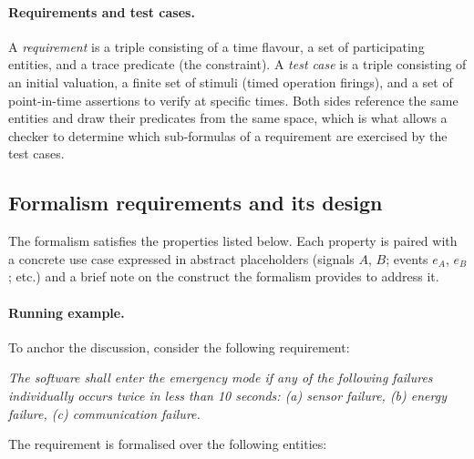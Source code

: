 \paragraph{Requirements and test cases.} A \emph{requirement} is a triple consisting of a time flavour, a set of participating entities, and a trace predicate (the constraint). A \emph{test case} is a triple consisting of an initial valuation, a finite set of stimuli (timed operation firings), and a set of point-in-time assertions to verify at specific times. Both sides reference the same entities and draw their predicates from the same space, which is what allows a checker to determine which sub-formulas of a requirement are exercised by the test cases.

\subsection{Formalism requirements and its design}

The formalism satisfies the properties listed below. Each property is paired with a concrete use case expressed in abstract placeholders (signals $A$, $B$; events $e_A$, $e_B$; etc.) and a brief note on the construct the formalism provides to address it.

\paragraph{Running example.}
To anchor the discussion, consider the following requirement:

\medskip
\textit{The software shall enter the emergency mode if any of the following failures individually occurs twice in less than 10 seconds: (a) sensor failure, (b) energy failure, (c) communication failure.}

\medskip
The requirement is formalised over the following entities:

